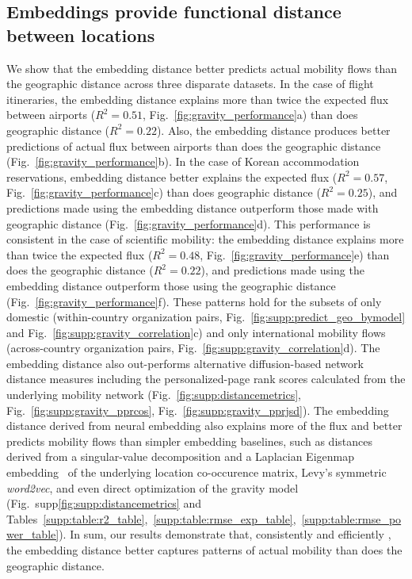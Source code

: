 \documentclass[12pt]{article} %
\begin{document}
%
%
%
\subsection*{Embeddings provide functional distance between locations}

We show that the embedding distance better predicts actual mobility flows than the geographic distance across three disparate datasets.
In the case of flight itineraries, the embedding distance explains more than twice the expected flux between airports ($R^{2} = 0.51$, Fig.~\ref{fig:gravity_performance}a) than does geographic distance ($R^{2} = 0.22$).  
Also, the embedding distance produces better predictions of actual flux between airports than does the geographic distance (Fig.~\ref{fig:gravity_performance}b).
In the case of Korean accommodation reservations, embedding distance better explains the expected flux ($R^{2} = 0.57$, Fig.~\ref{fig:gravity_performance}c) than does geographic distance ($R^{2} = 0.25$), and predictions made using the embedding distance outperform those made with geographic distance (Fig.~\ref{fig:gravity_performance}d).
This performance is consistent in the case of scientific mobility:
the embedding distance explains more than twice the expected flux ($R^{2} = 0.48$, Fig.~\ref{fig:gravity_performance}e) than does the geographic distance ($R^{2} = 0.22$), and predictions made using the embedding distance outperform those using the geographic distance (Fig.~\ref{fig:gravity_performance}f).
These patterns hold for the subsets of only domestic (within-country organization pairs, Fig.~\ref{fig:supp:predict_geo_bymodel} and Fig.~\ref{fig:supp:gravity_correlation}c) and only international mobility flows (across-country organization pairs, Fig.~\ref{fig:supp:gravity_correlation}d).
The embedding distance also out-performs alternative diffusion-based network distance measures including the personalized-page rank scores calculated from the underlying mobility network (Fig.~\ref{fig:supp:distancemetrics}, Fig.~\ref{fig:supp:gravity_pprcos}, Fig.~\ref{fig:supp:gravity_pprjsd}).
The embedding distance derived from neural embedding also explains more of the flux and better predicts mobility flows than simpler embedding baselines, such as distances derived from a singular-value decomposition and a Laplacian Eigenmap embedding~\autocite{belkin2003laplacian} of the underlying location co-occurence matrix, Levy's symmetric \textit{word2vec}\autocite{levy2014neural}, and even direct optimization of the gravity model (Fig.~supp\ref{fig:supp:distancemetrics} and Tables~\ref{supp:table:r2_table},~\ref{supp:table:rmse_exp_table},~\ref{supp:table:rmse_power_table}).
In sum, our results demonstrate that, consistently and efficiently , the embedding distance better captures patterns of actual mobility than does the geographic distance.
\end{document}
